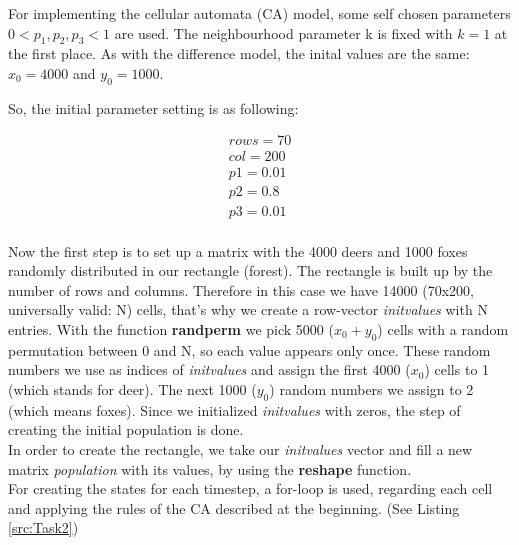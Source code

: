 \documentclass[a4paper,12pt]{article}
\begin{document}
For implementing the cellular automata (CA) model, some self chosen
parameters $0 < p_1, p_2, p_3 < 1$ are used. The neighbourhood parameter k is fixed with $k= 1$ at the first place. 
As with the difference model, the inital values are the same: $x_0=4000$ and $y_0=1000$.

So, the initial parameter setting is as following:

\begin{center}
\begin{displaymath}
\begin{split}
rows = 70\\
col = 200\\
p1= 0.01\\ %
p2= 0.8\\ %
p3= 0.01\\ %
\end{split}
\end{displaymath}
\end{center}

Now the first step is to set up a matrix with the 4000 deers and 1000 foxes randomly distributed in our rectangle (forest). The rectangle is built up by the number of rows and columns. Therefore in this case we have 14000 (70x200, universally valid: N) cells, that's why we create a row-vector \textit{initvalues} with N entries. With the function \textbf{randperm} we pick 5000 ($x_0+y_0$) cells with a random permutation between 0 and N, so each value appears only once. These random numbers we use as indices of \textit{initvalues} and assign the first 4000 ($x_0$) cells to 1 (which stands for deer). The next 1000 ($y_0$) random numbers we assign to 2 (which means foxes). Since we initialized \textit{initvalues} with zeros, the step of creating the initial population is done.\\
In order to create the rectangle, we take our \textit{initvalues} vector and fill a new matrix \textit{population} with its values, by using the \textbf{reshape} function.\\

For creating the states for each timestep, a for-loop is used, regarding each cell and applying the rules of the CA described at the beginning. (See Listing \ref{src:Task2})\\
\end{document}
